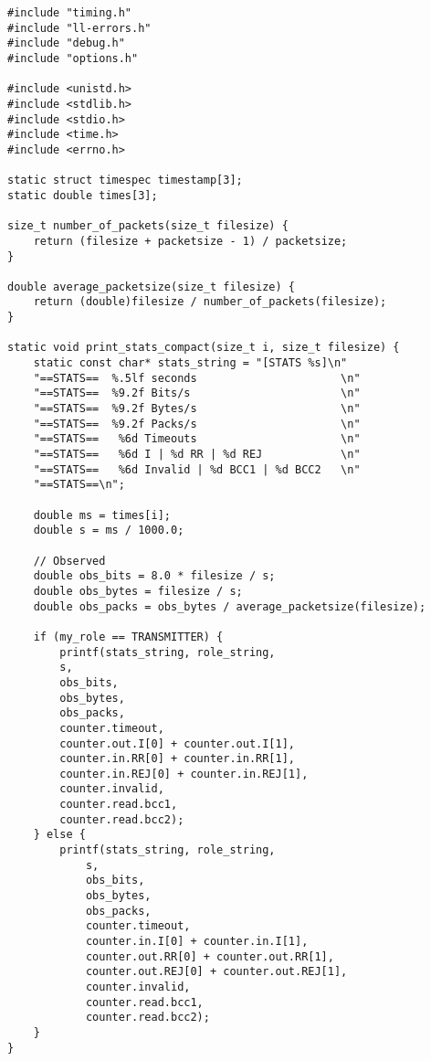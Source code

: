 \documentclass[subfiles]{main.tex}
\begin{document}
\begin{lstlisting}[style=rcom]
#include "timing.h"
#include "ll-errors.h"
#include "debug.h"
#include "options.h"

#include <unistd.h>
#include <stdlib.h>
#include <stdio.h>
#include <time.h>
#include <errno.h>

static struct timespec timestamp[3];
static double times[3];

size_t number_of_packets(size_t filesize) {
	return (filesize + packetsize - 1) / packetsize;
}

double average_packetsize(size_t filesize) {
	return (double)filesize / number_of_packets(filesize);
}

static void print_stats_compact(size_t i, size_t filesize) {
	static const char* stats_string = "[STATS %s]\n"
	"==STATS==  %.5lf seconds                      \n"
	"==STATS==  %9.2f Bits/s                       \n"
	"==STATS==  %9.2f Bytes/s                      \n"
	"==STATS==  %9.2f Packs/s                      \n"
	"==STATS==   %6d Timeouts                      \n"
	"==STATS==   %6d I | %d RR | %d REJ            \n"
	"==STATS==   %6d Invalid | %d BCC1 | %d BCC2   \n"
	"==STATS==\n";
	
	double ms = times[i];
	double s = ms / 1000.0;
	
	// Observed
	double obs_bits = 8.0 * filesize / s;
	double obs_bytes = filesize / s;
	double obs_packs = obs_bytes / average_packetsize(filesize);
	
	if (my_role == TRANSMITTER) {
		printf(stats_string, role_string,
		s,
		obs_bits,
		obs_bytes,
		obs_packs,
		counter.timeout,
		counter.out.I[0] + counter.out.I[1],
		counter.in.RR[0] + counter.in.RR[1],
		counter.in.REJ[0] + counter.in.REJ[1],
		counter.invalid,
		counter.read.bcc1,
		counter.read.bcc2);
	} else {
		printf(stats_string, role_string,
			s,
			obs_bits,
			obs_bytes,
			obs_packs,
			counter.timeout,
			counter.in.I[0] + counter.in.I[1],
			counter.out.RR[0] + counter.out.RR[1],
			counter.out.REJ[0] + counter.out.REJ[1],
			counter.invalid,
			counter.read.bcc1,
			counter.read.bcc2);
	}
}


\end{lstlisting}
\end{document}
